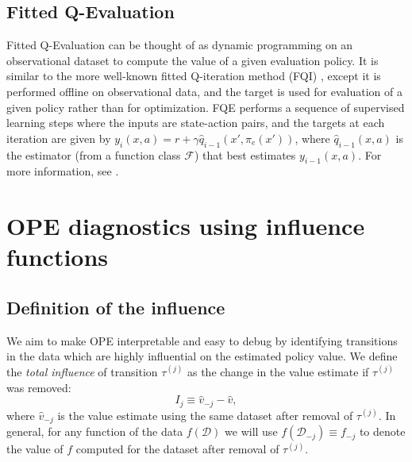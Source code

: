 \documentclass{article}
\begin{document}
\subsection{Fitted Q-Evaluation}

Fitted Q-Evaluation \citep{le2019batch} can be thought of as dynamic programming on an observational dataset to compute the value of a given evaluation policy. It is similar to the more well-known fitted Q-iteration method (FQI) \citep{ernst2005tree}, except it is performed offline on observational data, and the target is used for evaluation of a given policy rather than for optimization. FQE performs a sequence of supervised learning steps where the inputs are state-action pairs, and the targets at each iteration are given by $y_i(x, a) = r + \gamma \hat{q}_{i-1}(x', \pi_e(x'))$, where $\hat{q}_{i-1}(x, a)$ is the estimator (from a function class $\mathcal{F}$) that best estimates $y_{i-1}(x, a)$. For more information, see \citet{le2019batch}.

\section{OPE diagnostics using influence functions}

\subsection{Definition of the influence}

We aim to make OPE interpretable and easy to debug by identifying transitions in the data which are highly influential on the estimated policy value. We define the \emph{total influence} of transition $\tau^{(j)}$ as the change in the value estimate if $\tau^{(j)}$ was removed:
\begin{equation}
    I_j \equiv \hat{v}_{-j} - \hat{v},
\end{equation}
where $\hat{v}_{-j}$ is the value estimate using the same dataset after removal of $\tau^{(j)}$. In general, for any function of the data $f(\mathcal{D})$ we will use $f(\mathcal{D}_{-j}) \equiv f_{-j}$ to denote the value of $f$ computed for the dataset after removal of $\tau^{(j)}$.
\end{document}
